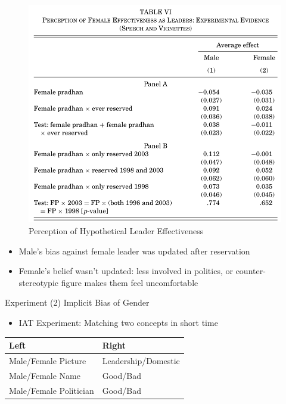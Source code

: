 \documentclass[
  10pt,
  ignorenonframetext,
  aspectratio=43,
]{beamer}
\providecommand{\tightlist}{%
  \setlength{\itemsep}{0pt}\setlength{\parskip}{0pt}}
\begin{document}
\begin{frame}
\begin{figure}
\centering
\includegraphics{20220523-qje-beaman-duflo-powerful-women.assets/table6-hypothetical effectiveness.png}
\caption{Perception of Hypothetical Leader Effectiveness}
\end{figure}

\begin{itemize}
\tightlist
\item
  Male's bias against female leader was updated after reservation
\item
  Female's belief wasn't updated: less involved in politics, or
  counter-stereotypic figure makes them feel uncomfortable
\end{itemize}
\end{frame}

\begin{frame}{Experiment (2) Implicit Bias of Gender}
\protect\hypertarget{experiment-2-implicit-bias-of-gender}{}
\begin{itemize}
\tightlist
\item
  IAT Experiment: Matching two concepts in short time
\end{itemize}

\begin{longtable}[]{@{}ll@{}}
\toprule
Left & Right \\
\midrule
\endhead
Male/Female Picture & Leadership/Domestic \\
Male/Female Name & Good/Bad \\
Male/Female Politician & Good/Bad \\
\bottomrule
\end{longtable}
\end{frame}
\end{document}
